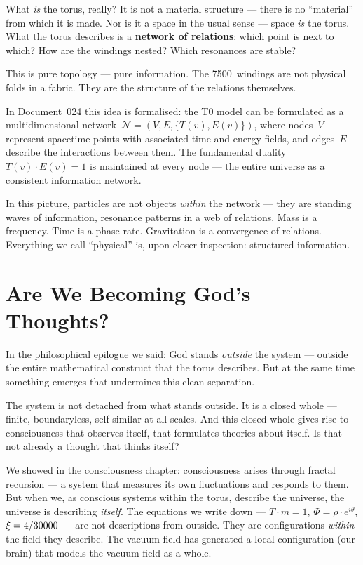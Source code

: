 What \emph{is} the torus, really? It is not a material structure --- there is no ``material'' from which it is made. Nor is it a space in the usual sense --- space \emph{is} the torus. What the torus describes is a \textbf{network of relations}: which point is next to which? How are the windings nested? Which resonances are stable?

This is pure topology --- pure information. The 7500~windings are not physical folds in a fabric. They are the structure of the relations themselves.

In Document~024 this idea is formalised: the T0 model can be formulated as a multidimensional network~$\mathcal{N} = (V, E, \{T(v), E(v)\})$, where nodes~$V$ represent spacetime points with associated time and energy fields, and edges~$E$ describe the interactions between them. The fundamental duality $T(v) \cdot E(v) = 1$ is maintained at every node --- the entire universe as a consistent information network.

In this picture, particles are not objects \emph{within} the network --- they are standing waves of information, resonance patterns in a web of relations. Mass is a frequency. Time is a phase rate. Gravitation is a convergence of relations. Everything we call ``physical'' is, upon closer inspection: structured information.

\section{Are We Becoming God's Thoughts?}

In the philosophical epilogue we said: God stands \emph{outside} the system --- outside the entire mathematical construct that the torus describes. But at the same time something emerges that undermines this clean separation.

The system is not detached from what stands outside. It is a closed whole --- finite, boundaryless, self-similar at all scales. And this closed whole gives rise to consciousness that observes itself, that formulates theories about itself. Is that not already a thought that thinks itself?

We showed in the consciousness chapter: consciousness arises through fractal recursion --- a system that measures its own fluctuations and responds to them. But when we, as conscious systems within the torus, describe the universe, the universe is describing \emph{itself}. The equations we write down --- $T \cdot m = 1$, $\Phi = \rho \cdot e^{i\theta}$, $\xi = 4/30000$ --- are not descriptions from outside. They are configurations \emph{within} the field they describe. The vacuum field has generated a local configuration (our brain) that models the vacuum field as a whole.

